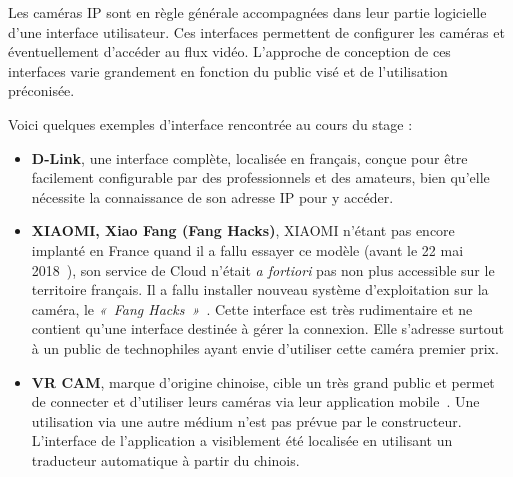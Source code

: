         Les caméras IP sont en règle générale accompagnées dans leur partie logicielle d'une interface utilisateur. Ces interfaces permettent de configurer les caméras et éventuellement d'accéder au flux vidéo. L'approche de conception de ces interfaces varie grandement en fonction du public visé et de l'utilisation préconisée.

Voici quelques exemples d'interface rencontrée au cours du stage :
\begin{itemize}
\item         \textbf{D-Link}, une interface complète, localisée en français, conçue pour être facilement configurable par des professionnels et des amateurs, bien qu'elle nécessite la connaissance de son adresse IP pour y accéder.
\item         \textbf{XIAOMI, Xiao Fang (Fang Hacks)}, XIAOMI n'étant pas encore implanté en France quand il a fallu essayer ce modèle (avant le 22 mai 2018~\cite{Xiaomi}), son service de Cloud n'était \textit{a fortiori} pas non plus accessible sur le territoire français. Il a fallu installer nouveau système d'exploitation sur la caméra, le \textit{«~Fang Hacks~»}~\cite{FangHacks}. Cette interface est très rudimentaire et ne contient qu'une interface destinée à gérer la connexion. Elle s'adresse surtout à un  public de technophiles ayant envie d'utiliser cette caméra premier prix.
\item         \textbf{VR CAM}, marque d'origine chinoise, cible un très grand public et permet de connecter et d'utiliser leurs caméras via leur application mobile~\cite{VRCam}. Une utilisation via une autre médium n'est pas prévue par le constructeur. L'interface de l'application a visiblement été localisée en utilisant un traducteur automatique à partir du chinois.
\end{itemize}


